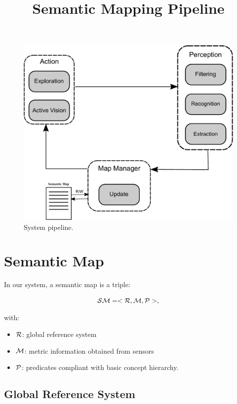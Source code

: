 \documentclass{article}
\title{\LARGE \bf Semantic Mapping Pipeline}
\begin{document}
	
	\maketitle	
	
	\begin{figure}[htbp]
		\centering
		\includegraphics[width=\linewidth]{pics/drawing-crop.pdf}
		\caption{System pipeline.}
		\label{fig:pipeline}
	\end{figure}
	
	\newpage
	\section{Semantic Map}
	
	In our system, a semantic map is a triple:
	
	\begin{equation}
		\mathcal{SM} = < \mathcal{R}, \mathcal{M}, \mathcal{P} >,
	\end{equation}
	
	\noindent
	with:
	
	\begin{itemize}
		\item $\mathcal{R}$: global reference system
		\item $\mathcal{M}$: metric information obtained from sensors
		\item $\mathcal{P}$: predicates compliant with basic concept hierarchy.
	\end{itemize}
	
	\subsection{Global Reference System}	
	
\end{document}
